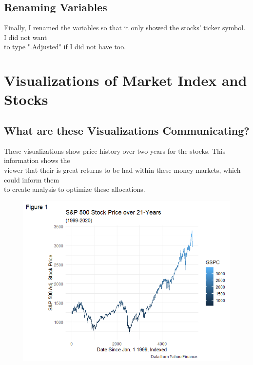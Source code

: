 \documentclass{article}
\begin{document}
    \subsection{Renaming Variables}
        Finally, I renamed the variables so that it only showed the stocks' ticker symbol. I did not want \\
        to type ".Adjusted" if I did not have too.
\newpage

\section{Visualizations of Market Index and Stocks}
    \subsection{What are these Visualizations Communicating?}
        These visualizations show price history over two years for the stocks. This information shows the \\
        viewer that their is great returns to be had within these money markets, which could inform them \\
        to create analysis to optimize these allocations.

    \begin{figure}[htp]
        \includegraphics[width=17cm]{PS6a_Carpenter.png}
    \end{figure}
    \newpage
    
\end{document}
